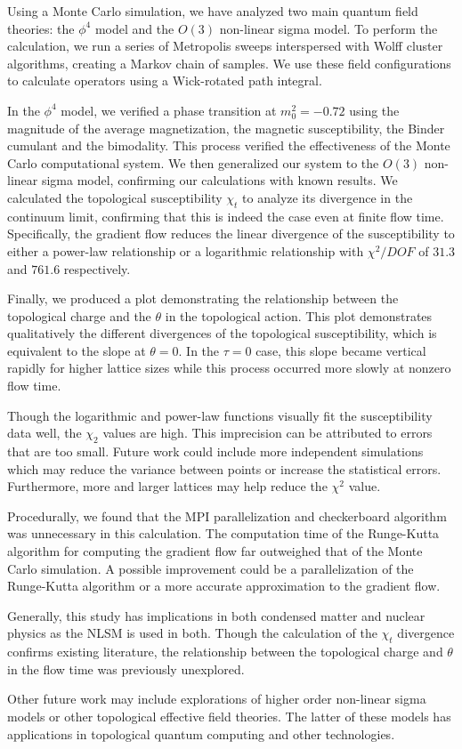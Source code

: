 Using a Monte Carlo simulation, we have analyzed two main quantum field theories: the $\phi^4$ model and the $O(3)$ non-linear sigma model. To perform the calculation, we run a series of Metropolis sweeps interspersed with Wolff cluster algorithms, creating a Markov chain of samples. We use these field configurations to calculate operators using a Wick-rotated path integral.

In the $\phi^4$ model, we verified a phase transition at $m_0^2=-0.72$ using the magnitude of the average magnetization, the magnetic susceptibility, the Binder cumulant and the bimodality. This process verified the effectiveness of the Monte Carlo computational system. We then generalized our system to the $O(3)$ non-linear sigma model, confirming our calculations with known results. We calculated the topological susceptibility $\chi_t$ to analyze its divergence in the continuum limit, confirming that this is indeed the case even at finite flow time. Specifically, the gradient flow reduces the linear divergence of the susceptibility to either a power-law relationship or a logarithmic relationship with $\chi^2/DOF$ of $31.3$ and $761.6$ respectively. 


Finally, we produced a plot demonstrating the relationship between the topological charge and the $\theta$ in the topological action. This plot demonstrates qualitatively the different divergences of the topological susceptibility, which is equivalent to the slope at $\theta=0$. In the $\tau=0$ case, this slope became vertical rapidly for higher lattice sizes while this process occurred more slowly at nonzero flow time. 

Though the logarithmic and power-law functions visually fit the susceptibility data well, the $\chi_2$ values are high. This imprecision can be attributed to errors that are too small. Future work could include more independent simulations which may reduce the variance between points or increase the statistical errors. Furthermore, more and larger lattices may help reduce the $\chi^2$ value.

Procedurally, we found that the MPI parallelization and checkerboard algorithm was unnecessary in this calculation. The computation time of the Runge-Kutta algorithm for computing the gradient flow far outweighed that of the Monte Carlo simulation. A possible improvement could be a parallelization of the Runge-Kutta algorithm or a more accurate approximation to the gradient flow.

Generally, this study has implications in both condensed matter and nuclear physics as the NLSM is used in both. Though the calculation of the $\chi_t$ divergence confirms existing literature, the relationship between the topological charge and $\theta$ in the flow time was previously unexplored. 

Other future work may include explorations of higher order non-linear sigma models or other topological effective field theories. The latter of these models has applications in topological quantum computing and other technologies.



\appendix

